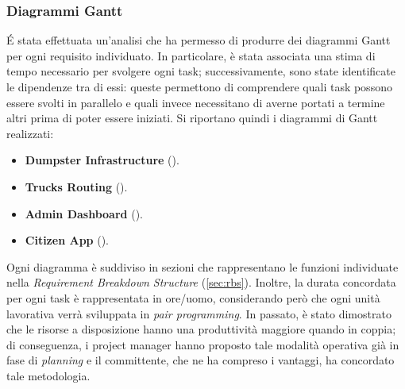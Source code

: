 \subsubsection{Diagrammi Gantt}
\'E stata effettuata un'analisi che ha permesso di produrre dei diagrammi Gantt per ogni requisito individuato. In particolare, è stata associata una stima di tempo necessario per svolgere ogni task; successivamente, sono state identificate le dipendenze tra di essi: queste permettono di comprendere quali task possono essere svolti in parallelo e quali invece necessitano di averne portati a termine altri prima di poter essere iniziati. Si riportano quindi i diagrammi di Gantt realizzati:
\begin{itemize}
    \item \textbf{Dumpster Infrastructure} ().
    \item \textbf{Trucks Routing} ().
    \item \textbf{Admin Dashboard} ().
    \item \textbf{Citizen App} ().
\end{itemize}
Ogni diagramma è suddiviso in sezioni che rappresentano le funzioni individuate nella \textit{Requirement Breakdown Structure} (\ref{sec:rbs}). Inoltre, la durata concordata per ogni task è rappresentata in ore/uomo, considerando però che ogni unità lavorativa verrà sviluppata in \textit{pair programming}.
In passato, è stato dimostrato che le risorse a disposizione hanno una produttività maggiore quando in coppia; di conseguenza, i project manager hanno proposto tale modalità operativa già in fase di \textit{planning} e il committente, che ne ha compreso i vantaggi, ha concordato tale metodologia.
